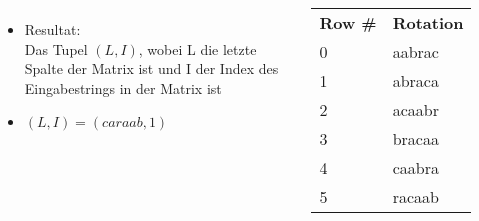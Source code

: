 \documentclass[14pt,xcolor=dvipsnames,pdftex]{beamer}
\begin{document}
\begin{frame}[allowframebreaks]
\begin{columns}[c,onlytextwidth]
\begin{itemize}
  \item Resultat:\\
      Das Tupel \textit{$(L,I)$}, wobei L die {\color{red}letzte Spalte} der Matrix ist
      und I der Index des {\color{darkgreen}Eingabestrings in der Matrix} ist
  \item $(L,I) = (caraab, 1)$
 \end{itemize}
    \begin{tabular}{T|T}
    \textbf{Row \#} & \textbf{Rotation} \\
    0 & aabra{\color{red}c} \\
    {\color{darkgreen}1} & {\color{darkgreen}abrac}{\color{red}a} \\
    2 & acaab{\color{red}r} \\
    3 & braca{\color{red}a} \\
    4 & caabr{\color{red}a} \\
    5 & racaa{\color{red}b} \\
    \end{tabular}
\end{columns}
\end{frame}
\end{document}

